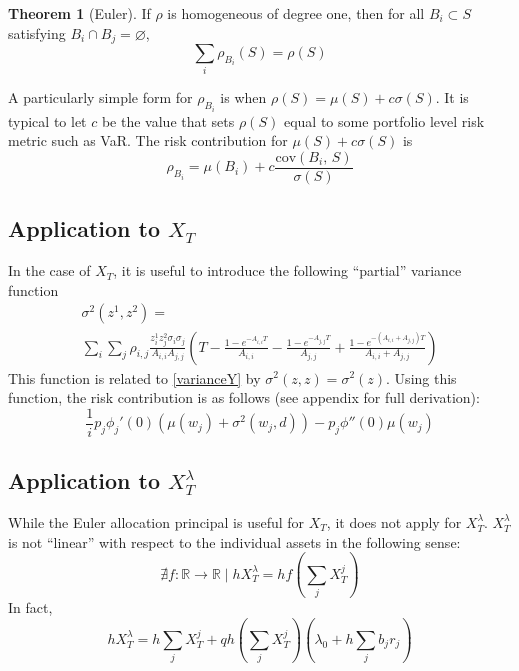 \documentclass[12pt]{article}
\theoremstyle{definition}
\newtheorem{theorem}{Theorem}
\begin{document}
\begin{theorem}[Euler]
If \(\rho\) is homogeneous of degree one, then for all \(B_i \subset S\) satisfying  \(B_i \cap B_j =\varnothing\), 
\begin{equation}
\sum_i \rho_{B_i} (S) =\rho (S)
\end{equation}
\end{theorem}

A particularly simple form for \(\rho_{B_i}\) is when \(\rho(S)=\mu(S)+c\sigma(S)\).  It is typical to let \(c\) be the value that sets \(\rho(S)\) equal to some portfolio level risk metric such as VaR.  The risk contribution for \(\mu(S)+c\sigma(S)\) is 
\begin{equation}
\rho_{B_i}=\mu(B_i)+c\frac{\mathrm{cov}(B_i,\,S)}{\sigma(S)}
\end{equation}
\subsection{Application to \(X_T\)}
In the case of \(X_T\), it is useful to introduce the following ``partial'' variance function 
\begin{multline} \sigma^2(z^1, z^2)=\\ \sum_i \sum_j \rho_{i,j} \frac{ z_i^1 z_j^2 \sigma_i \sigma_j}{A_{i,i} A_{j,j}} \left(T-\frac{1-e^{-A_{i,i}T}}{A_{i,i}}-\frac{1-e^{-A_{j,j}T}}{A_{j,j}}+\frac{1-e^{-(A_{i,i}+A_{j,j})T}}{A_{i,i}+A_{j,j}}\right) \end{multline}
This function is related to \ref{varianceY} by \(\sigma^2(z, z)=\sigma^2(z)\).  Using this function, the risk contribution is as follows (see appendix for full derivation):
\begin{equation}
\frac{1}{i}p_j \phi_j '(0) \left(\mu (w_j)+ \sigma^2(w_j, d)\right)-  p_j\phi''(0)  \mu(w_j)
\end{equation}
\subsection{Application to \(X_T ^ \lambda\)} \label{appXTLambda}
While the Euler allocation principal is useful for \(X_T\),  it does not apply for \(X_T ^ \lambda\).   \(X_T ^\lambda\) is not ``linear'' with respect to the individual assets in the following sense:
\[\nexists f:\mathbb{R} \to \mathbb{R} \mid hX_T^\lambda= h f\left(\sum_j X_T ^ j\right)\]
In fact, 
\[ hX_T^\lambda=h\sum_j X_T ^ j+qh\left(\sum_j X_T ^ j\right)\left(\lambda_0+h\sum_j b_j r_j\right) \]
\end{document}
